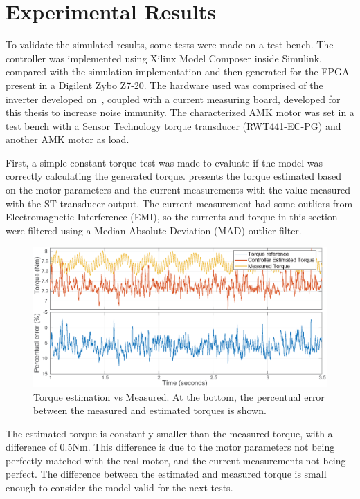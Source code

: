 \documentclass[9pt,conference]{IEEEtran}
\begin{document}
\section{Experimental Results}
\label{section:simulation}%

To validate the simulated results, some tests were made on a test bench. The controller was implemented using Xilinx Model Composer inside Simulink, compared with the simulation implementation and then generated for the FPGA present in a Digilent Zybo Z7-20. The hardware used was comprised of the inverter developed on~\cite{Costa:MSc}, coupled with a current measuring board, developed for this thesis to increase noise immunity. The characterized AMK motor was set in a test bench with a Sensor Technology torque transducer (RWT441-EC-PG) and another AMK motor as load.

First, a simple constant torque test was made to evaluate if the model was correctly calculating the generated torque.  presents the torque estimated based on the motor parameters and the current measurements with the value measured with the ST transducer output. The current measurement had some outliers from Electromagnetic Interference (EMI), so the currents and torque in this section were filtered using a Median Absolute Deviation (MAD) outlier filter.

\begin{figure}[!htb]
	\centering
	\includegraphics[width=1\linewidth]{Figures/constantTq.eps}
	\caption[Torque estimation vs Measured. In the bottom the percentual error between the measured and estimated torques is shown.]{Torque estimation vs Measured. At the bottom, the percentual error between the measured and estimated torques is shown.}
	\label{fig:constant_tq} %
\end{figure}

The estimated torque is constantly smaller than the measured torque, with a difference of 0.5Nm. This difference is due to the motor parameters not being perfectly matched with the real motor, and the current measurements not being perfect. The difference between the estimated and measured torque is small enough to consider the model valid for the next tests.
\end{document}
